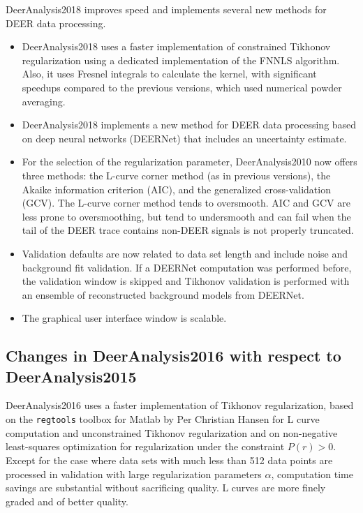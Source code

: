 \documentclass{article}
\begin{document}
DeerAnalysis2018 improves speed and implements several new methods for DEER data processing.

\begin{itemize}
\item
DeerAnalysis2018 uses a faster implementation of constrained Tikhonov regularization using a dedicated implementation of the FNNLS algorithm. Also, it uses Fresnel integrals to calculate the kernel, with significant speedups compared to the previous versions, which used numerical powder averaging.
\item
DeerAnalysis2018 implements a new method for DEER data processing based on deep neural networks (DEERNet) that includes an uncertainty estimate.
\item
For the selection of the regularization parameter, DeerAnalysis2010 now offers three methods: the L-curve corner method (as in previous versions), the Akaike information criterion (AIC), and the generalized cross-validation (GCV). The L-curve corner method tends to oversmooth. AIC and GCV are less prone to oversmoothing, but tend to undersmooth and can fail when the tail of the DEER trace contains non-DEER signals is not properly truncated.
\item
Validation defaults are now related to data set length and include noise and background fit validation. If a DEERNet computation was performed before, the validation window is skipped and Tikhonov validation is performed with an ensemble of reconstructed background models from DEERNet.
\item
The graphical user interface window is scalable. 
\end{itemize}

\subsection{Changes in DeerAnalysis2016 with respect to DeerAnalysis2015}
\label{changes_2016}

DeerAnalysis2016 uses a faster implementation of Tikhonov regularization, based on the \texttt{regtools} toolbox for Matlab by Per Christian Hansen for L curve computation and unconstrained Tikhonov regularization and on non-negative least-squares optimization for regularization under the constraint $P(r) > 0$. Except for the case where data sets with much less than 512 data points are processed in validation with large regularization parameters $\alpha$, computation time savings are substantial without sacrificing quality. L curves are more finely graded and of better quality. 
\end{document}
